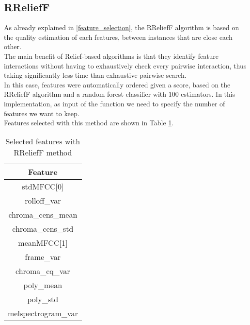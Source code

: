 \subsection{RReliefF}
As already explained in \ref{feature_selection}, the RReliefF algorithm is based on the quality estimation of each features, between instances that are close each other.
\\
The main benefit of Relief-based algorithms is that they identify feature interactions without having to exhaustively check every pairwise interaction, thus taking significantly less time than exhaustive pairwise search.
\\
In this case, features were automatically ordered given a score, based on the RReliefF algorithm and a random forest classifier with $100$ estimators. In this implementation, as input of the function we need to specify the number of features we want to keep.
\\
Features selected with this method are shown in Table \ref{table:rrelieff_features}.
\begin{table}[h!]
	\centering
	\begin{tabular}{|c|}
		\hline
		Feature\\ [0.5ex] 
		\hline\hline stdMFCC[0] \\
		\hline rolloff\_var \\
		\hline chroma\_cens\_mean \\
		\hline chroma\_cens\_std \\
		\hline meanMFCC[1] \\
		\hline frame\_var \\
		\hline chroma\_cq\_var \\
		\hline poly\_mean \\
		\hline poly\_std \\
		\hline melspectrogram\_var \\
		\hline
	\end{tabular}
	\caption{Selected features with RReliefF method}
	\label{table:rrelieff_features}
\end{table}

\newpage

